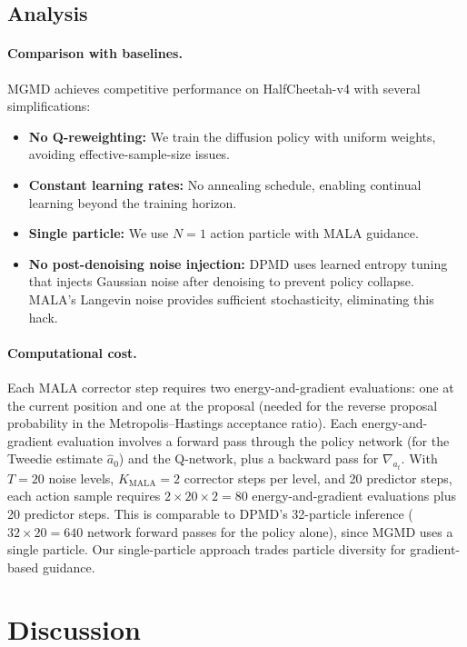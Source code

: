 \documentclass{article}
\theoremstyle{plain}
\theoremstyle{definition}
\theoremstyle{remark}
\begin{document}
\subsection{Analysis}

\paragraph{Comparison with baselines.}
MGMD achieves competitive performance on HalfCheetah-v4 with several simplifications:
\begin{itemize}
  \item \textbf{No Q-reweighting:} We train the diffusion policy with uniform weights, avoiding effective-sample-size issues.
  \item \textbf{Constant learning rates:} No annealing schedule, enabling continual learning beyond the training horizon.
  \item \textbf{Single particle:} We use $N=1$ action particle with MALA guidance.
  \item \textbf{No post-denoising noise injection:} DPMD uses learned entropy tuning that injects Gaussian noise after denoising to prevent policy collapse. MALA's Langevin noise provides sufficient stochasticity, eliminating this hack.
\end{itemize}

\paragraph{Computational cost.}
Each MALA corrector step requires two energy-and-gradient evaluations: one at the current position and one at the proposal (needed for the reverse proposal probability in the Metropolis--Hastings acceptance ratio).
Each energy-and-gradient evaluation involves a forward pass through the policy network (for the Tweedie estimate $\hat{a}_0$) and the Q-network, plus a backward pass for $\nabla_{a_t}$.
With $T=20$ noise levels, $K_{\text{MALA}}=2$ corrector steps per level, and 20 predictor steps, each action sample requires $2 \times 20 \times 2 = 80$ energy-and-gradient evaluations plus 20 predictor steps.
This is comparable to DPMD's 32-particle inference ($32 \times 20 = 640$ network forward passes for the policy alone), since MGMD uses a single particle.
Our single-particle approach trades particle diversity for gradient-based guidance.


\section{Discussion}
\label{sec:discussion}
\end{document}
